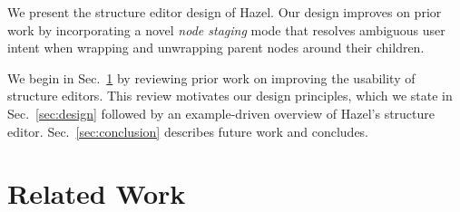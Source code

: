 \documentclass[runningheads]{llncs}
\newcommand{\Hazel}{\textsf{Hazel}\xspace}
\begin{document}
We present the structure editor design of \Hazel. Our design improves on prior work by incorporating a novel \emph{node staging} mode that resolves ambiguous user intent when wrapping and unwrapping parent nodes around their children. 

 We begin in Sec.~\ref{sec:related-work} by reviewing prior work on improving the usability of structure editors. This review motivates our design principles, which we state in Sec.~\ref{sec:design} followed by an example-driven overview of \Hazel's structure editor. Sec.~\ref{sec:conclusion} describes future work and concludes.

\section{Related Work} \label{sec:related-work}
\end{document}
